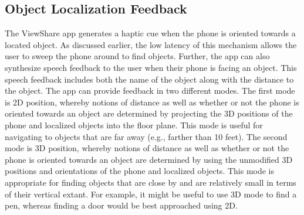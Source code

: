 \documentclass[chi_draft]{sigchi}
\begin{document}
\subsection{Object Localization Feedback}
The ViewShare app generates a haptic cue when the phone is oriented towards a located object.  As discussed earlier, the low latency of this mechanism allows the user to sweep the phone around to find objects.  Further, the app can also synthesize speech feedback to the user when their phone is facing an object.  This speech feedback includes both the name of the object along with the distance to the object.  The app can provide feedback in two different modes.  The first mode is 2D position, whereby notions of distance as well as whether or not the phone is oriented towards an object are determined by projecting the 3D positions of the phone and localized objects into the floor plane.  This mode is useful for navigating to objects that are far away (e.g., farther than 10 feet).  The second mode is 3D position, whereby notions of distance as well as whether or not the phone is oriented towards an object are determined by using the unmodified 3D positions and orientations of the phone and localized objects.  This mode is appropriate for finding objects that are close by and are relatively small in terms of their vertical extant.  For example, it might be useful to use 3D mode to find a pen, whereas finding a door would be best approached using 2D.
\end{document}
